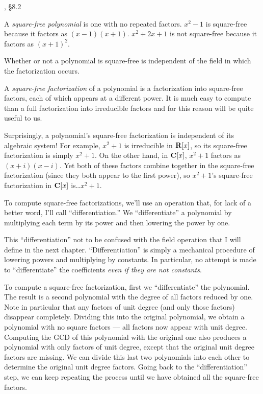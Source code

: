 \vfill\eject



\hbox{}\qquad [Geddes], \S 8.2

A {\it square-free polynomial} is one with no repeated factors.
$x^2-1$ is square-free because it factors as $(x-1)(x+1)$.  $x^2+2x+1$
is not square-free because it factors as $(x+1)^2$.

Whether or not a polynomial is square-free is independent of the field
in which the factorization occurs.

A {\it square-free factorization} of a polynomial is a factorization
into square-free factors, each of which appears at a different power.
It is much easy to compute than a full factorization into irreducible
factors and for this reason will be quite useful to us.

Surprisingly, a polynomial's square-free factorization is independent
of its algebraic system!  For example, $x^2+1$ is irreducible in ${\bf
R}[x]$, so its square-free factorization is simply $x^2+1$.  On the
other hand, in ${\bf C}[x]$, $x^2+1$ factors as $(x+i)(x-i)$.  Yet
both of these factors combine together in the square-free
factorization (since they both appear to the first power), so
$x^2+1$'s square-free factorization in ${\bf C}[x]$ is\ldots $x^2+1$.

To compute square-free factorizations, we'll use an operation that,
for lack of a better word, I'll call ``differentiation.''  We
``differentiate'' a polynomial by multiplying each term by its power
and then lowering the power by one.

This ``differentiation'' not to be confused with the field operation
that I will define in the next chapter.  ``Differentiation'' is simply
a mechanical procedure of lowering powers and multiplying by
constants.  In particular, no attempt is made to ``differentiate''
the coefficients {\it even if they are not constants}.

To compute a square-free factorization, first we ``differentiate'' the
polynomial.  The result is a second polynomial with the degree of all
factors reduced by one.  Note in particular that any factors of unit
degree (and only those factors) disappear completely.  Dividing this
into the original polynomial, we obtain a polynomial with no square
factors --- all factors now appear with unit degree.  Computing the
GCD of this polynomial with the original one also produces a
polynomial with only factors of unit degree, except that the original
unit degree factors are missing.  We can divide this last two
polynomials into each other to determine the original unit degree
factors.  Going back to the ``differentiation'' step, we can keep
repeating the process until we have obtained all the square-free
factors.

